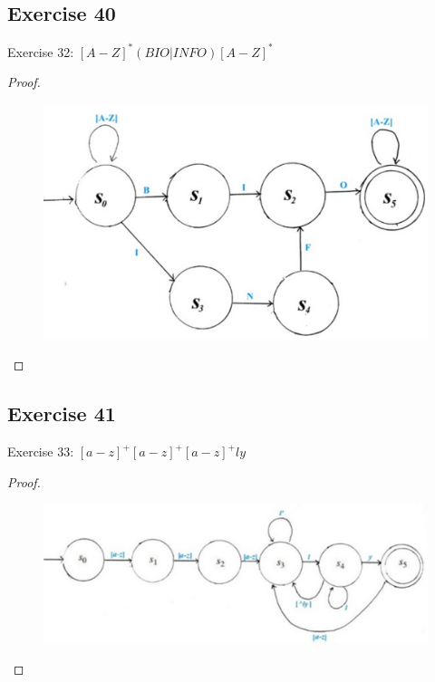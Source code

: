 \documentclass[14pt]{extarticle}
\begin{document}
\subsection{Exercise 40}
Exercise 32: \([A-Z]^*(BIO | INFO)[A-Z]^*\)
\begin{proof}
    \begin{figure}[ht!]
        \centering
        \includegraphics[scale=0.25]{../images/12.2.40.png}
    \end{figure}
\end{proof}

\subsection{Exercise 41}
Exercise 33: \([a-z]^+[a-z]^+[a-z]^+ ly\)
\begin{proof}
    \begin{figure}[ht!]
        \centering
        \includegraphics[scale=0.4]{../images/12.2.41.png}
    \end{figure}
\end{proof}
\end{document}
